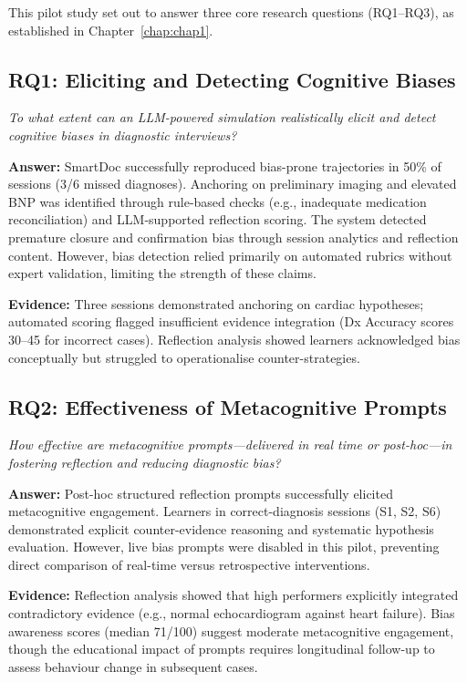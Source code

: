 This pilot study set out to answer three core research questions (RQ1--RQ3), as
established in Chapter~\ref{chap:chap1}.

\subsection{RQ1: Eliciting and Detecting Cognitive Biases}

\textit{To what extent can an LLM-powered simulation realistically elicit and detect
cognitive biases in diagnostic interviews?}

\noindent
\textbf{Answer:} SmartDoc successfully reproduced bias-prone trajectories in 50\% of
sessions (3/6 missed diagnoses). Anchoring on preliminary imaging and elevated BNP was
identified through rule-based checks (e.g., inadequate medication reconciliation) and
LLM-supported reflection scoring. The system detected premature closure and confirmation
bias through session analytics and reflection content. However, bias detection relied
primarily on automated rubrics without expert validation, limiting the strength of these
claims.

\noindent
\textbf{Evidence:} Three sessions demonstrated anchoring on cardiac hypotheses; automated
scoring flagged insufficient evidence integration (Dx Accuracy scores 30--45 for incorrect
cases). Reflection analysis showed learners acknowledged bias conceptually but struggled to
operationalise counter-strategies.

\subsection{RQ2: Effectiveness of Metacognitive Prompts}

\textit{How effective are metacognitive prompts—delivered in real time or post-hoc—in
fostering reflection and reducing diagnostic bias?}

\noindent
\textbf{Answer:} Post-hoc structured reflection prompts successfully elicited metacognitive
engagement. Learners in correct-diagnosis sessions (S1, S2, S6) demonstrated explicit
counter-evidence reasoning and systematic hypothesis evaluation. However, live bias prompts
were disabled in this pilot, preventing direct comparison of real-time versus retrospective
interventions.

\noindent
\textbf{Evidence:} Reflection analysis showed that high performers explicitly integrated
contradictory evidence (e.g., normal echocardiogram against heart failure). Bias awareness
scores (median 71/100) suggest moderate metacognitive engagement, though the educational
impact of prompts requires longitudinal follow-up to assess behaviour change in subsequent
cases.


